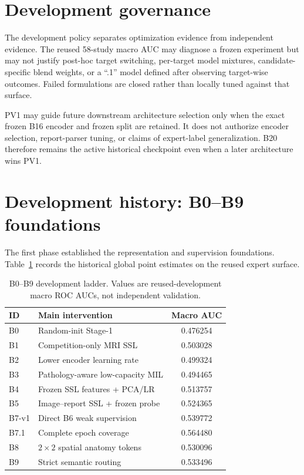 \documentclass[preprint,12pt]{elsarticle}
\begin{document}
\section{Development governance}
\label{sec:governance}

The development policy separates optimization evidence from independent evidence. The reused 58-study macro AUC may diagnose a frozen experiment but may not justify post-hoc target switching, per-target model mixtures, candidate-specific blend weights, or a ``.1'' model defined after observing target-wise outcomes. Failed formulations are closed rather than locally tuned against that surface.

PV1 may guide future downstream architecture selection only when the exact frozen B16 encoder and frozen split are retained. It does not authorize encoder selection, report-parser tuning, or claims of expert-label generalization. B20 therefore remains the active historical checkpoint even when a later architecture wins PV1.

\section{Development history: B0--B9 foundations}
\label{sec:b0b9}

The first phase established the representation and supervision foundations. Table~\ref{tab:b0b9} records the historical global point estimates on the reused expert surface.

\begin{table}[ht]
\centering
\caption{B0--B9 development ladder. Values are reused-development macro ROC AUCs, not independent validation.}
\label{tab:b0b9}
\begin{tabular}{llc}
\toprule
ID & Main intervention & Macro AUC \\
\midrule
B0 & Random-init Stage-1 & 0.476254 \\
B1 & Competition-only MRI SSL & 0.503028 \\
B2 & Lower encoder learning rate & 0.499324 \\
B3 & Pathology-aware low-capacity MIL & 0.494465 \\
B4 & Frozen SSL features + PCA/LR & 0.513757 \\
B5 & Image--report SSL + frozen probe & 0.524365 \\
B7-v1 & Direct B6 weak supervision & 0.539772 \\
B7.1 & Complete epoch coverage & 0.564480 \\
B8 & $2\times2$ spatial anatomy tokens & 0.530096 \\
B9 & Strict semantic routing & 0.533496 \\
\bottomrule
\end{tabular}
\end{table}
\end{document}
